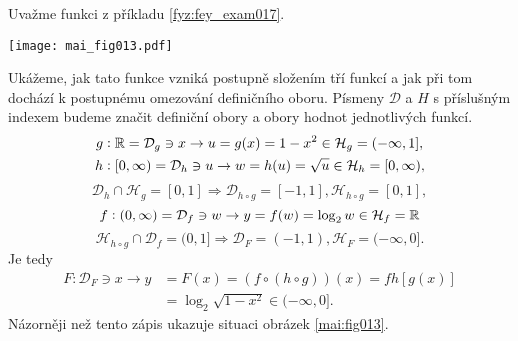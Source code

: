 \wikitextrule
\begin{example}\label{MAI:exam025}
  Uvažme funkci z příkladu \ref{fyz:fey_exam017}. 
  
  {\centering
   \captionsetup{type=figure}
%   
   \texttt{[image: mai\_fig013.pdf]}
  \par}
  
  Ukážeme, jak tato funkce vzniká postupně složením tří funkcí a jak při tom dochází k postupnému 
  omezování definičního oboru. Písmeny \(\mathcal{D}\) a \(H\) s příslušným indexem budeme značit 
  definiční obory a obory hodnot jednotlivých funkcí.
  \begin{align*}
    g&:  \mathbb{R} =\mathcal{D}_g\ni x\rightarrow u=g(x) = 1- x^2  \in\mathcal{H}_g=(-\infty,1], \\
    h&: [0,\infty)=\mathcal{D}_h\ni u\rightarrow w=h(u) = \sqrt{u}\in\mathcal{H}_h=[0,\infty),
  \end{align*}
  \begin{equation*}
    \mathcal{D}_h\cap\mathcal{H}_g = [0,1]\Rightarrow\mathcal{D}_{h\circ g}=[-1,1], 
    \mathcal{H}_{h\circ g} = [0,1], 
  \end{equation*}
  \begin{equation*}
    f:(0,\infty)=\mathcal{D}_f\ni w \rightarrow y=f(w)=\log_2w\in\mathcal{H}_f=\mathbb{R}
  \end{equation*}
  \begin{equation*}
    \mathcal{H}_{h\circ g}\cap\mathcal{D}_f = (0,1] 
    \Rightarrow\mathcal{D}_F=(-1,1),\mathcal{H}_F=(-\infty,0]. 
  \end{equation*}
  Je tedy
  \begin{align*}
    F:\mathcal{D}_F\ni x\rightarrow 
    y&=F(x)=(f\circ(h\circ g))(x) = f{h[g(x)]}          \\
     &= \log_2\sqrt{1-x^2}\in(-\infty,0].
  \end{align*}
  Názorněji než tento zápis ukazuje situaci obrázek \ref{mai:fig013}.
\end{example}